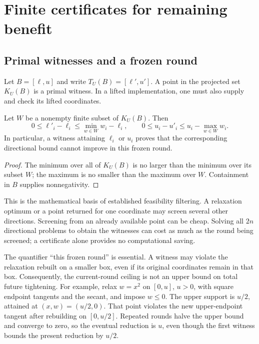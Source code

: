 \section{Finite certificates for remaining benefit}\label{sec:certificates}

\subsection{Primal witnesses and a frozen round}

Let $B=[\ell,u]$ and write $T_U(B)=[\ell',u']$. A point in the
projected set $K_U(B)$ is a primal witness. In a lifted implementation,
one must also supply and check its lifted coordinates.

\begin{proposition}\label{prop:current}
Let $W$ be a nonempty finite subset of $K_U(B)$. Then
\begin{equation}\label{eq:current-ceilings}
 0\le\ell'_i-\ell_i\le\min_{w\in W}w_i-\ell_i,
 \qquad
 0\le u_i-u'_i\le u_i-\max_{w\in W}w_i.
\end{equation}
In particular, a witness attaining $\ell_i$ or $u_i$ proves that the
corresponding directional bound cannot improve in this frozen round.
\end{proposition}
\begin{proof}
The minimum over all of $K_U(B)$ is no larger than the minimum over its
subset $W$; the maximum is no smaller than the maximum over $W$.
Containment in $B$ supplies nonnegativity.
\end{proof}

This is the mathematical basis of established feasibility filtering.
A relaxation optimum or a point returned for one coordinate may screen
several other directions. Screening from an already available point can
be cheap. Solving all $2n$ directional problems to obtain the witnesses
can cost as much as the round being screened; a certificate alone provides
no computational saving.

The quantifier ``this frozen round'' is essential. A witness may violate
the relaxation rebuilt on a smaller box, even if its original coordinates
remain in that box. Consequently, the current-round ceiling is not an
upper bound on total future tightening.
For example, relax $w=x^2$ on $[0,u]$, $u>0$, with square endpoint tangents and
the secant, and impose $w\le0$. The upper support is $u/2$, attained
at $(x,w)=(u/2,0)$. That point violates the new upper-endpoint tangent
after rebuilding on $[0,u/2]$. Repeated rounds halve the upper bound
and converge to zero, so the eventual reduction is $u$, even though
the first witness bounds the present reduction by $u/2$.

